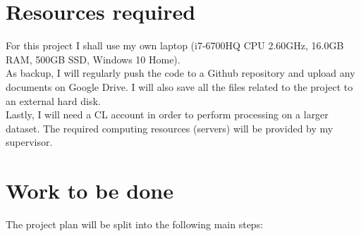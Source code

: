 \section*{Resources required}

For this project I shall use my own laptop (i7-6700HQ CPU 2.60GHz, 16.0GB RAM, 500GB SSD, Windows 10 Home). \\
As backup, I will regularly push the code to a Github repository and upload any documents on Google Drive. I will also save all the files related to the project to an external hard disk. \\
Lastly, I will need a CL account in order to perform processing on a larger dataset. The required computing resources (servers) will be provided by my supervisor. \\


\section*{Work to be done}

The project plan will be split into the following main steps:\\

